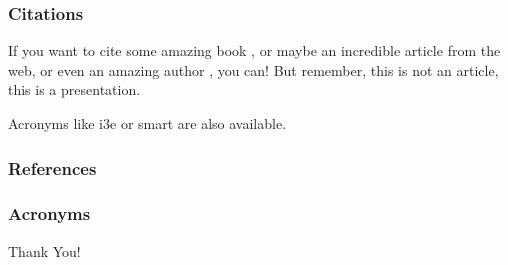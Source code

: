 \documentclass[aspectratio=169,table,xcdraw,18pt]{beamer}
\begin{document}

\begin{frame}
    \frametitle{Citations}

    If you want to cite some amazing book \cite{Genius1801}, or maybe
    an incredible article \cite{LaTeX2020} from the web, or even an
    amazing author \cite{SomeAuthor2022}, you can! But remember, this is
    not an article, this is a presentation.

    Acronyms like \ac{i3e} or \ac{smart} are also available.

\end{frame}


\begin{frame}[t,allowframebreaks]
    \frametitle{References}
    \printbibliography
\end{frame}


\begin{frame}
    \frametitle{Acronyms}
    \begin{acronym}[ICANN]
    \end{acronym}
\end{frame}


{
\begin{frame}
    \centering
    {\fontsize{50pt}{60pt}\selectfont Thank You!}
\end{frame}
}

\end{document}
